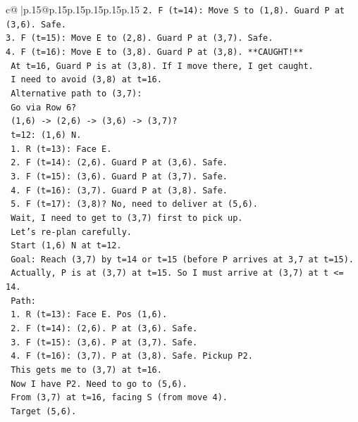 \documentclass{article}
\begin{document}
{\begin{supertabular}{c@{$\;$}|p{.15\linewidth}@{}p{.15\linewidth}p{.15\linewidth}p{.15\linewidth}p{.15\linewidth}p{.15\linewidth}}
{{{\texttt{2. F (t=14): Move S to (1,8). Guard P at (3,6). Safe.} \\
\texttt{3. F (t=15): Move E to (2,8). Guard P at (3,7). Safe.} \\
\texttt{4. F (t=16): Move E to (3,8). Guard P at (3,8). **CAUGHT!**} \\
\texttt{   At t=16, Guard P is at (3,8). If I move there, I get caught.} \\
\texttt{   I need to avoid (3,8) at t=16.} \\
\texttt{   Alternative path to (3,7):} \\
\texttt{   Go via Row 6?} \\
\texttt{   (1,6) {-}> (2,6) {-}> (3,6) {-}> (3,7)?} \\
\texttt{   t=12: (1,6) N.} \\
\texttt{   1. R (t=13): Face E.} \\
\texttt{   2. F (t=14): (2,6). Guard P at (3,6). Safe.} \\
\texttt{   3. F (t=15): (3,6). Guard P at (3,7). Safe.} \\
\texttt{   4. F (t=16): (3,7). Guard P at (3,8). Safe.} \\
\texttt{   5. F (t=17): (3,8)? No, need to deliver at (5,6).} \\
\texttt{   Wait, I need to get to (3,7) first to pick up.} \\
\texttt{   Let's re{-}plan carefully.} \\
\texttt{   Start (1,6) N at t=12.} \\
\texttt{   Goal: Reach (3,7) by t=14 or t=15 (before P arrives at 3,7 at t=15).} \\
\texttt{   Actually, P is at (3,7) at t=15. So I must arrive at (3,7) at t <= 14.} \\
\texttt{   Path:} \\
\texttt{   1. R (t=13): Face E. Pos (1,6).} \\
\texttt{   2. F (t=14): (2,6). P at (3,6). Safe.} \\
\texttt{   3. F (t=15): (3,6). P at (3,7). Safe.} \\
\texttt{   4. F (t=16): (3,7). P at (3,8). Safe. Pickup P2.} \\
\texttt{   This gets me to (3,7) at t=16.} \\
\texttt{   Now I have P2. Need to go to (5,6).} \\
\texttt{   From (3,7) at t=16, facing S (from move 4).} \\
\texttt{   Target (5,6).} \\
}}}
\end{supertabular}}
\end{document}

